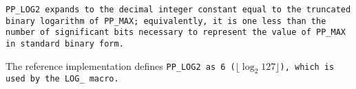 \tt{PP_LOG2} expands to the decimal integer constant
equal to the truncated binary logarithm of \tt{PP_MAX};
equivalently, it is one less than the number of significant bits
necessary to represent the value of \tt{PP_MAX} in standard binary form.

\note The reference implementation defines \tt{PP_LOG2} as 6
($\lfloor\log_2 127\rfloor$), which is used by the \tt{LOG_} macro.
